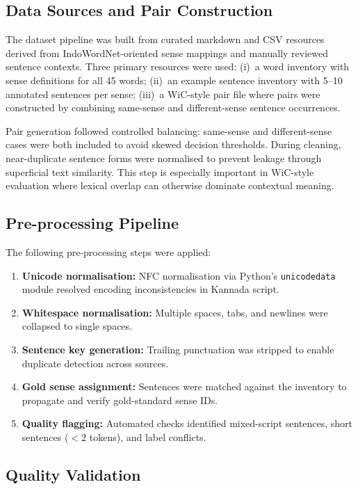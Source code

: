 \documentclass[conference]{IEEEtran}
\begin{document}
\subsection{Data Sources and Pair Construction}

The dataset pipeline was built from curated markdown and CSV resources derived
from IndoWordNet-oriented sense mappings and manually reviewed sentence
contexts.
Three primary resources were used:
(i)~a word inventory with sense definitions for all 45 words;
(ii)~an example sentence inventory with 5--10 annotated sentences per sense;
(iii)~a WiC-style pair file where pairs were constructed by combining same-sense
and different-sense sentence occurrences.

Pair generation followed controlled balancing: same-sense and different-sense
cases were both included to avoid skewed decision thresholds.
During cleaning, near-duplicate sentence forms were normalised to prevent
leakage through superficial text similarity.
This step is especially important in WiC-style evaluation where lexical overlap
can otherwise dominate contextual meaning.

\subsection{Pre-processing Pipeline}

The following pre-processing steps were applied:
\begin{enumerate}
  \item \textbf{Unicode normalisation:} NFC normalisation via Python's
        \texttt{unicodedata} module resolved encoding inconsistencies in
        Kannada script.
  \item \textbf{Whitespace normalisation:} Multiple spaces, tabs, and newlines
        were collapsed to single spaces.
  \item \textbf{Sentence key generation:} Trailing punctuation was stripped
        to enable duplicate detection across sources.
  \item \textbf{Gold sense assignment:} Sentences were matched against the
        inventory to propagate and verify gold-standard sense IDs.
  \item \textbf{Quality flagging:} Automated checks identified mixed-script
        sentences, short sentences ($<2$ tokens), and label conflicts.
\end{enumerate}

\subsection{Quality Validation}
\end{document}
